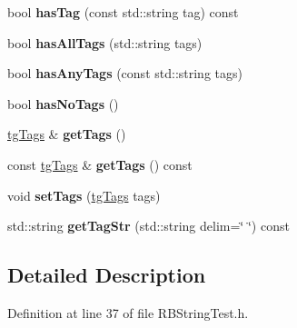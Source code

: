 \begin{DoxyCompactItemize}
\item 
\hypertarget{classtg_taggable_ae31f65869c8887bfeb34a344902c4d5b}{bool {\bfseries has\-Tag} (const std\-::string tag) const }\label{classtg_taggable_ae31f65869c8887bfeb34a344902c4d5b}

\item 
\hypertarget{classtg_taggable_a33b77b1075171b63f673965687b2e844}{bool {\bfseries has\-All\-Tags} (std\-::string tags)}\label{classtg_taggable_a33b77b1075171b63f673965687b2e844}

\item 
\hypertarget{classtg_taggable_af14af28fa98021c4f20a5e8f2ddd5606}{bool {\bfseries has\-Any\-Tags} (const std\-::string tags)}\label{classtg_taggable_af14af28fa98021c4f20a5e8f2ddd5606}

\item 
\hypertarget{classtg_taggable_adff345e116e16420c701a748ff8f995f}{bool {\bfseries has\-No\-Tags} ()}\label{classtg_taggable_adff345e116e16420c701a748ff8f995f}

\item 
\hypertarget{classtg_taggable_acf1d7fa9df8f374f25015c4080902681}{\hyperlink{classtg_tags}{tg\-Tags} \& {\bfseries get\-Tags} ()}\label{classtg_taggable_acf1d7fa9df8f374f25015c4080902681}

\item 
\hypertarget{classtg_taggable_ae70d7d3b45301665bc363b0ed8b9b292}{const \hyperlink{classtg_tags}{tg\-Tags} \& {\bfseries get\-Tags} () const }\label{classtg_taggable_ae70d7d3b45301665bc363b0ed8b9b292}

\item 
\hypertarget{classtg_taggable_a5492888e4e4da4cca6261070b5726adf}{void {\bfseries set\-Tags} (\hyperlink{classtg_tags}{tg\-Tags} tags)}\label{classtg_taggable_a5492888e4e4da4cca6261070b5726adf}

\item 
\hypertarget{classtg_taggable_a346d66b066d2d9eb1eadba01da43749f}{std\-::string {\bfseries get\-Tag\-Str} (std\-::string delim=\char`\"{} \char`\"{}) const }\label{classtg_taggable_a346d66b066d2d9eb1eadba01da43749f}

\end{DoxyCompactItemize}


\subsection{Detailed Description}


Definition at line 37 of file R\-B\-String\-Test.\-h.



